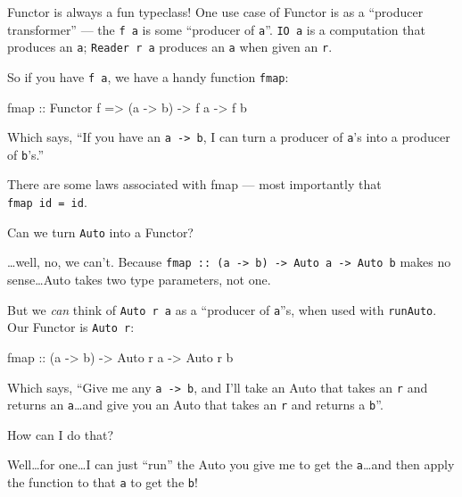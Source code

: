 \documentclass[]{article}
\newenvironment{Shaded}{}{}
\newcommand{\DataTypeTok}[1]{\textcolor[rgb]{0.56,0.13,0.00}{#1}}
\newcommand{\FunctionTok}[1]{\textcolor[rgb]{0.02,0.16,0.49}{#1}}
\newcommand{\NormalTok}[1]{#1}
\newcommand{\OtherTok}[1]{\textcolor[rgb]{0.00,0.44,0.13}{#1}}
\begin{document}
Functor is always a fun typeclass! One use case of Functor is as a ``producer
transformer'' --- the \texttt{f\ a} is some ``producer of \texttt{a}''.
\texttt{IO\ a} is a computation that produces an \texttt{a};
\texttt{Reader\ r\ a} produces an \texttt{a} when given an \texttt{r}.

So if you have \texttt{f\ a}, we have a handy function \texttt{fmap}:

\begin{Shaded}
\begin{Highlighting}[]
\FunctionTok{fmap}\OtherTok{ ::} \DataTypeTok{Functor}\NormalTok{ f }\OtherTok{=\textgreater{}}\NormalTok{ (a }\OtherTok{{-}\textgreater{}}\NormalTok{ b) }\OtherTok{{-}\textgreater{}}\NormalTok{ f a }\OtherTok{{-}\textgreater{}}\NormalTok{ f b}
\end{Highlighting}
\end{Shaded}

Which says, ``If you have an \texttt{a\ -\textgreater{}\ b}, I can turn a
producer of \texttt{a}'s into a producer of \texttt{b}'s.''

There are some laws associated with fmap --- most importantly that
\texttt{fmap\ id\ =\ id}.

Can we turn \texttt{Auto} into a Functor?

\ldots well, no, we can't. Because
\texttt{fmap\ ::\ (a\ -\textgreater{}\ b)\ -\textgreater{}\ Auto\ a\ -\textgreater{}\ Auto\ b}
makes no sense\ldots Auto takes two type parameters, not one.

But we \emph{can} think of \texttt{Auto\ r\ a} as a ``producer of \texttt{a}''s,
when used with \texttt{runAuto}. Our Functor is \texttt{Auto\ r}:

\begin{Shaded}
\begin{Highlighting}[]
\FunctionTok{fmap}\OtherTok{ ::}\NormalTok{ (a }\OtherTok{{-}\textgreater{}}\NormalTok{ b) }\OtherTok{{-}\textgreater{}} \DataTypeTok{Auto}\NormalTok{ r a }\OtherTok{{-}\textgreater{}} \DataTypeTok{Auto}\NormalTok{ r b}
\end{Highlighting}
\end{Shaded}

Which says, ``Give me any \texttt{a\ -\textgreater{}\ b}, and I'll take an Auto
that takes an \texttt{r} and returns an \texttt{a}\ldots and give you an Auto
that takes an \texttt{r} and returns a \texttt{b}''.

How can I do that?

Well\ldots for one\ldots I can just ``run'' the Auto you give me to get the
\texttt{a}\ldots and then apply the function to that \texttt{a} to get the
\texttt{b}!
\end{document}
